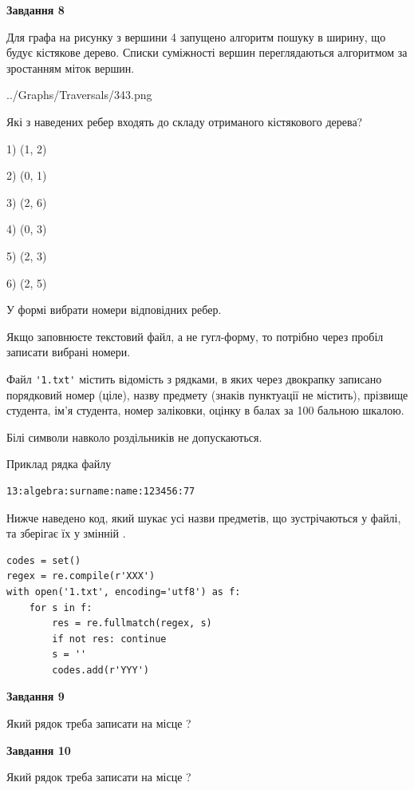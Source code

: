 \documentclass[12pt, ukrainian]{article}
\def\code#1{\Verb!#1!}
\begin{document}
{\begin {large}
{\begin {center}\textbf{Завдання 8}\end {center}}\par
Для графа на рисунку з вершини 4 запущено алгоритм пошуку в ширину, що будує кістякове дерево. Списки суміжності вершин переглядаються алгоритмом за зростанням міток вершин.\par
\begin{center}
	{../Graphs/Traversals/343.png}
\end{center}
\par Які з наведених ребер входять до складу отриманого кістякового дерева?\par
1) (1, 2)\par
2) (0, 1)\par
3) (2, 6)\par
4) (0, 3)\par
5) (2, 3)\par
6) (2, 5)\par
{\vskip 15pt} У формі вибрати номери відповідних ребер.


Якщо заповнюєте текстовий файл, а не гугл-форму, то потрібно через пробіл записа\-ти вибрані номери.\par
\newpage


Файл \code{'1.txt'} містить відомість з рядками, в яких через двокрапку записано поряд\-ковий номер (ціле), назву предмету (знаків пунктуації не містить), прізвище студента, ім'я студента, номер заліковки, оцінку в балах за 100 бальною шкалою.

Білі символи навколо роздільників не допускаються.

Приклад рядка файлу



\begin{verbatim}
13:algebra:surname:name:123456:77
\end{verbatim}


Нижче наведено код, який шукає усі назви предметів, що зустрічаються у файлі, та зберігає їх у змінній .



\begin{verbatim}
codes = set()
regex = re.compile(r'XXX')
with open('1.txt', encoding='utf8') as f:
    for s in f:
        res = re.fullmatch(regex, s)
        if not res: continue
        s = ''
        codes.add(r'YYY')
\end{verbatim}


{\begin {center}\textbf{Завдання 9}\end {center}}\par
Який рядок треба записати на місце  ?\par
\vspace{5mm}


{\begin {center}\textbf{Завдання 10}\end {center}}\par
Який рядок треба записати на місце  ?\par


\newpage


\end {large}}
\end{document}

